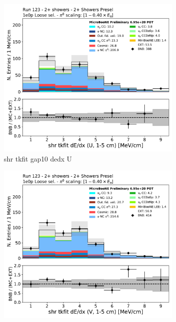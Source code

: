 \begin{figure}[H]
    \centering
    \begin{subfigure}{0.3\textwidth}
    \includegraphics[width=1.0\textwidth]{Sidebands/Figures/TwoShr_1e0pSel/loose/shr_tkfit_gap10_dedx_U.pdf}
    \caption{shr tkfit gap10 dedx U}
    \end{subfigure}
    \begin{subfigure}{0.3\textwidth}
    \includegraphics[width=1.0\textwidth]{Sidebands/Figures/TwoShr_1e0pSel/loose/shr_tkfit_gap10_dedx_V.pdf}

\end{subfigure}
\end{figure}
